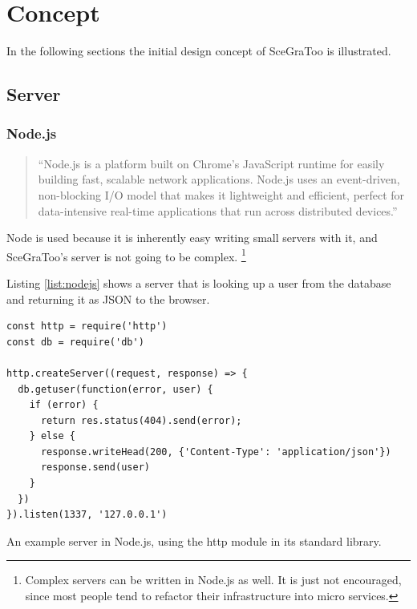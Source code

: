 
\section{Concept}
\label{concept}


In the following sections the initial design concept of \gls{SceGraToo} is illustrated.

\subsection{Server}
\label{server}


\subsubsection{Node.js}
\begin{quote}
  ``Node.js is a platform built on Chrome's JavaScript runtime for easily building fast, scalable network applications. Node.js uses an event-driven, non-blocking I/O model that makes it lightweight and efficient, perfect for data-intensive real-time applications that run across distributed devices.'' \cite{nodejs}
\end{quote}

Node is used because it is inherently easy writing small servers with it, and
SceGraToo's server is not going to be complex. \footnote{Complex servers can be
written in Node.js as well. It is just not encouraged, since most people tend to
refactor their infrastructure into micro services.}

Listing \ref{list:nodejs} shows a server that is looking up a user from the database and returning it as \gls{JSON} to the browser.

\begin{listing}
  \begin{verbatim}
const http = require('http')
const db = require('db')

http.createServer((request, response) => {
  db.getuser(function(error, user) {
    if (error) {
      return res.status(404).send(error);
    } else {
      response.writeHead(200, {'Content-Type': 'application/json'})
      response.send(user)
    }
  })
}).listen(1337, '127.0.0.1')
  \end{verbatim}
  \caption{An example server in Node.js, using the http module in its standard library.}
  \label{list:nodejs}
\end{listing}

